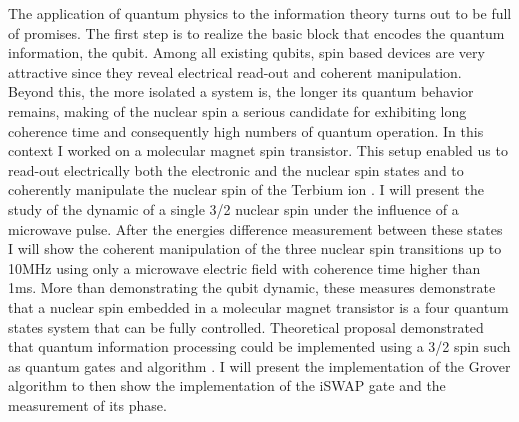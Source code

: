The application of quantum physics to the information theory turns out to be full of promises. The first step is to realize the basic block that encodes the quantum information, the qubit. Among all existing qubits, spin based devices are very attractive since they reveal electrical read-out and coherent manipulation. Beyond this, the more isolated a system is, the longer its quantum behavior remains, making of the nuclear spin a serious candidate for exhibiting long coherence time and consequently high numbers of quantum operation.
In this context I worked on a molecular magnet spin transistor. This setup enabled us to read-out electrically both the electronic and the nuclear spin states and to coherently manipulate the nuclear spin of the Terbium ion \cite{Thiele_2014,Godfrin_2017}. I will present the study of the dynamic of a single 3/2 nuclear spin under the influence of a microwave pulse. After the energies difference measurement between these states I will show the coherent manipulation of the three nuclear spin transitions up to 10MHz using only a microwave electric field with coherence time higher than 1ms. 
More than demonstrating the qubit dynamic, these measures demonstrate that a nuclear spin embedded in a molecular magnet transistor is a four quantum states system that can be fully controlled. Theoretical proposal demonstrated that quantum information processing could be implemented using a 3/2 spin such as quantum gates \cite{Kiktenko_2015} and algorithm \cite{Leuenberger_2002}. I will present the implementation of the Grover algorithm \cite{Godfrin_2017a} to then show the implementation of the iSWAP gate and the measurement of its phase.